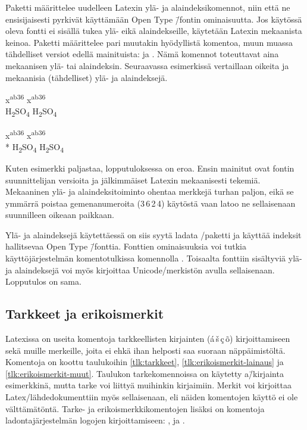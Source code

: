 Paketti  määrittelee uudelleen Latexin ylä- ja
alaindeksikomennot, niin että ne ensisijaisesti pyrkivät käyttämään Open
Type \=/fontin ominaisuutta. Jos käytössä oleva fontti ei sisällä tukea
ylä- eikä alaindekseille, käytetään Latexin mekaanista keinoa. Paketti
määrittelee pari muutakin hyödyllistä komentoa, muun muassa tähdelliset
versiot edellä mainituista:  ja
. Nämä komennot toteuttavat aina
mekaanisen ylä- tai alaindeksin. Seuraavassa esimerkissä vertaillaan
oikeita ja mekaanisia (tähdelliset) ylä- ja alaindeksejä.

\pagebreak[3]

\begin{koodilohkosis}
  x\textsuperscript {ab36}
  x\textsuperscript*{ab36} \\
  H\textsubscript {2}SO\textsubscript {4}
  H\textsubscript*{2}SO\textsubscript*{4}
\end{koodilohkosis}

\begin{tulossis}
  x\textsuperscript {ab36}
  x\textsuperscript*{ab36} \\*
  H\textsubscript {2}SO\textsubscript {4}
  H\textsubscript*{2}SO\textsubscript*{4}
\end{tulossis}

Kuten esimerkki paljastaa, lopputuloksessa on eroa. Ensin mainitut ovat
fontin suunnittelijan versioita ja jälkimmäiset Latexin mekaanisesti
tekemiä. Mekaaninen ylä- ja ala\-in\-dek\-si\-toi\-min\-to ohentaa
merkkejä turhan paljon, eikä se ymmärrä poistaa gemenanumeroita
(3\,6\,2\,4) käytöstä vaan latoo ne sellaisenaan suunnilleen oikeaan
paikkaan.

Ylä- ja alaindeksejä käytettäessä on siis syytä ladata
\-/paketti ja käyttää indeksit hallitsevaa Open
Type \=/fonttia. Fonttien ominaisuuksia voi tutkia käyttöjärjestelmän
komentotulkissa komennolla . Toisaalta fonttiin
sisältyviä ylä- ja alaindeksejä voi myös kirjoittaa Unicode\-/merkistön
avulla sellaisenaan. Lopputulos on sama.

\subsection{Tarkkeet ja erikoismerkit}
\label{luku:tarkkeet}

Latexissa on useita komentoja tarkkeellisten kirjainten
(\'a\,\v{s}\,\c{c}\,\~o) kirjoittamiseen sekä muille merkeille, joita ei
ehkä ihan helposti saa suoraan näppäimistöltä. Komentoja on koottu
taulukoihin \ref{tlk:tarkkeet}, \ref{tlk:erikoismerkit-lainaus} ja
\ref{tlk:erikoismerkit-muut}. Taulukon tarkekomennoissa on käytetty
a\=/kirjainta esimerkkinä, mutta tarke voi liittyä muihinkin kirjaimiin.
\marginpar{\TeX \\
  \LaTeX \\ \LaTeXe} Merkit voi kirjoittaa Latex\-/lähdedokumenttiin
myös sellaisenaan, eli näiden komentojen käyttö ei ole välttämätöntä.
Tarke- ja erikoismerkkikomentojen lisäksi on komentoja
ladontajärjestelmän logojen kirjoittamiseen: ,
 ja .

